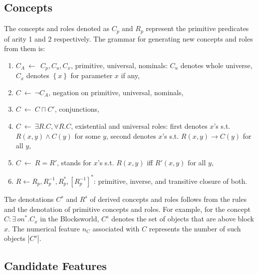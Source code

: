 \documentclass[letterpaper]{article} %
\newcommand{\set}[1]{\ensuremath{\left\{#1 \right\}}}
\begin{document}
\subsection{Concepts}

The concepts and roles denoted as $C_p$ and $R_p$ represent the primitive predicates of arity 1 and 2 respectively.
The grammar for generating new concepts and roles from them is:

\begin{enumerate}[{\small$\bullet$}]
  \item $C_A \ \leftarrow\ \ C_p, C_u, C_x$,  primitive, universal, nominals: $C_u$ denotes whole universe,
   $C_x$ denotes $\set{x}$ for parameter $x$ if any,
  \item $C \ \leftarrow\  \neg C_A$,   negation on primitive, universal, nominals,
  \item $C \ \leftarrow\   C \sqcap C'$,   conjunctions,
  \item $C \ \leftarrow\  \exists R.C, \forall R.C$, existential and universal roles:  first denotes $x$'s  s.t.\  $R(x,y) \land C(y)$ for some  $y$, 
  second denotes $x$'s  s.t. $R(x,y) \rightarrow C(y)$ for all $y$,
  \item $C \ \leftarrow\  R=R'$, stands for $x$'s  s.t. $R(x,y)$ iff $R'(x,y)$ for all $y$,
  \item $R \leftarrow R_p, R_p^{-1}, R_p^*, [R_p^{-1}]^*$: primitive, inverse, and transitive closure of both.
 \end{enumerate}

The denotations   $C^s$  and $R^s$ of derived concepts and roles follows from the rules and the denotation of primitive
concepts and roles. For example, for the concept  $C: \exists\, on^* . C_x$ in  the  Blocksworld, 
$C^s$  denotes  the set of objects  that are above block $x$. The numerical feature
$n_C$ associated with $C$  represents the number of such objects $|C^s|$.

\subsection{Candidate Features}
\end{document}
